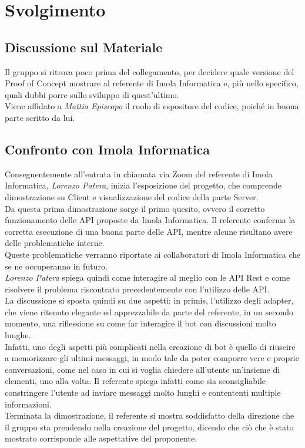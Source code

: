 \section{Svolgimento}

\subsection{Discussione sul Materiale} 
  Il gruppo si ritrova poco prima del collegamento, per decidere quale versione del Proof of Concept mostrare al referente di Imola Informatica e, più nello specifico, 
  quali dubbi porre sullo sviluppo di quest'ultimo. \\ 
  Viene affidato a \textit{Mattia Episcopo} il ruolo di espositore del codice, poiché in buona parte scritto da lui.
\subsection{Confronto con Imola Informatica}
  Conseguentemente all'entrata in chiamata via Zoom del referente di Imola Informatica, \textit{Lorenzo Patera}, inizia l'esposizione del progetto, che comprende dimostrazione su
  Client e visualizzazione del codice della parte Server. \\
  Da questa prima dimostrazione sorge il primo quesito, ovvero il corretto funzionamento delle API proposte da Imola Informatica. Il referente conferma
  la corretta esecuzione di una buona parte delle API, mentre alcune risultano avere delle problematiche interne. \\ 
  Queste problematiche verranno riportate ai collaboratori di Imola Informatica che se ne occuperanno in futuro.\\
  \textit{Lorenzo Patera} spiega quindi come interagire al meglio con le API Rest e come risolvere il problema riscontrato precedentemente con l'utilizzo delle API. \\
  La discussione si sposta quindi su due aspetti: in primis, l'utilizzo degli adapter, che viene ritenuto elegante ed apprezzabile da parte del referente, 
  in un secondo momento, una riflessione su come far interagire il bot con discussioni molto lunghe. \\
  Infatti, uno degli aspetti più complicati nella creazione di bot è quello di riuscire a memorizzare gli ultimi messaggi, in modo tale da poter comporre vere e proprie 
  conversazioni, come nel caso in cui si voglia chiedere all'utente un'insieme di elementi, uno alla volta. Il referente spiega infatti come sia sconsigliabile constringere 
  l'utente ad inviare messaggi molto lunghi e contententi multiple informazioni. \\
  Terminata la dimostrazione, il referente si mostra soddisfatto della direzione che il gruppo sta prendendo nella creazione del progetto, dicendo che ciò che è stato mostrato
  corrisponde alle aspettative del proponente.

